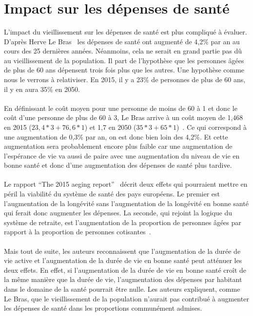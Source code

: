 \section{Impact sur les dépenses de santé}
\paragraph{}L’impact du vieillissement sur les dépenses de santé est plus compliqué à évaluer. D’après Herve Le Bras~\citep[pp.31]{heran} les dépenses de santé ont augmenté de 4,2\% par an au cours des 25 dernières années. Néanmoins, cela ne serait en grand partie pas dû au vieillissement de la population. Il part de l’hypothèse que les personnes âgées de plus de 60 ans dépensent trois fois plus que les autres. Une hypothèse comme nous le verrons à relativiser. En 2015, il y a 23\% de personnes de plus de 60 ans, il y en aura 35\% en 2050.


\paragraph{}En définissant le coût moyen pour une personne de moins de 60 à 1 et donc le coût d’une personne de plus de 60 à 3, Le Bras arrive à un coût moyen de 1,468 en 2015 ($23,4 * 3 + 76,6 * 1$) et 1,7 en 2050 ($35 * 3 + 65 *1$)~\citep[pp.31]{heran}. Ce qui correspond à une augmentation de 0,3\% par an, on est donc bien loin des 4,2\%. Et cette augmentation sera probablement encore plus faible car une augmentation de l’espérance de vie va aussi de paire avec une augmentation du niveau de vie en bonne santé et donc d’une augmentation des dépenses de santé plus tardive. 

\paragraph{}Le rapport “The 2015 aeging report”~\citep{ageing} décrit deux effets qui pourraient mettre en péril la viabilité du système de santé des pays européens. Le premier est l’augmentation de la longévité sans l’augmentation de la longévité en bonne santé qui ferait donc augmenter les dépenses. La seconde, qui rejoint la logique du système de retraite, est l’augmentation de la proportion de personnes âgées par rapport à la proportion de personnes cotisantes~\citep[pp.116]{ageing}.   

\paragraph{}Mais tout de suite, les auteurs reconnaissent que l’augmentation de la durée de vie active et l’augmentation de la durée de vie en bonne santé peut atténuer les deux effets. En effet, si l’augmentation de la durée de vie en bonne santé croît de la même manière que la durée de vie, l’augmentation des dépenses par habitant dans le domaine de la santé pourrait être nulle.  Les auteurs expliquent, comme Le Bras, que le vieillissement de la population n’aurait pas contribué à augmenter les dépenses de santé dans les proportions communément admises.~\citep[pp.116]{ageing} 

